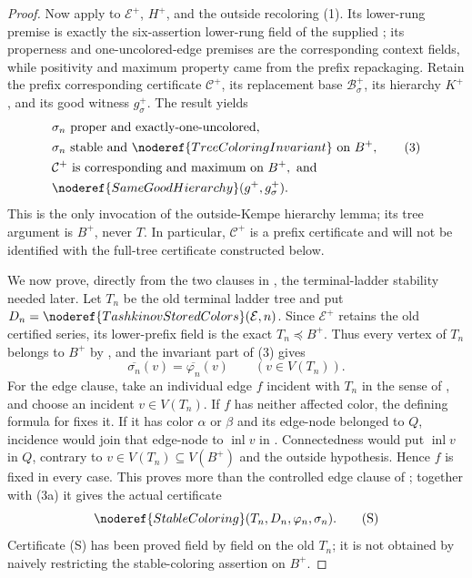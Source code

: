 \begin{proof}
Now apply  to \(\mathcal E^+\), \(H^+\), and
the outside recoloring (1).  Its lower-rung premise is exactly the
six-assertion lower-rung field of the supplied
; its properness and
one-uncolored-edge premises are the corresponding context fields, while
positivity and maximum property came from the prefix repackaging.  Retain
the prefix corresponding certificate \(\mathcal C^+\), its replacement
base \(\mathcal B^+_\sigma\), its hierarchy \(K^+\), and its good witness
\(g^+_\sigma\).  The result yields
\[
 \begin{split}
 &\sigma_n\text{ proper and exactly-one-uncolored},\\
 &\sigma_n\text{ stable and }\noderef{TreeColoringInvariant}\text{ on }B^+,
                                                               \tag{3}\\
 &\mathcal C^+\text{ is corresponding and maximum on }B^+,\text{ and}\\
 &\noderef{SameGoodHierarchy}(g^+,g^+_\sigma).
 \end{split}
\]
This is the only invocation of the outside-Kempe hierarchy lemma; its tree
argument is \(B^+\), never \(T\).  In particular, \(\mathcal C^+\) is a
prefix certificate and will not be identified with the full-tree
certificate constructed below.

We now prove, directly from the two clauses in
, the terminal-ladder stability needed later.
Let \(T_n\) be the old terminal ladder tree and put
\(D_n=\noderef{TashkinovStoredColors}(\mathcal E,n)\).  Since
\(\mathcal E^+\) retains the old certified series, its lower-prefix field
is the exact 
\(T_n\preccurlyeq B^+\).  Thus every vertex of \(T_n\) belongs to
\(B^+\) by , and the invariant part of
(3) gives
\[
 \overline{\sigma_n}(v)=\overline{\varphi_n}(v)
 \qquad(v\in V(T_n)).                                      \tag{3a}
\]
For the edge clause, take an individual edge \(f\) incident with \(T_n\)
in the sense of , and choose an incident
\(v\in V(T_n)\).  If \(f\) has neither affected color, the defining
formula for  fixes it.  If it has color
\(\alpha\) or \(\beta\) and its edge-node belonged to \(Q\), incidence
would join that edge-node to \(\operatorname{inl}v\) in
.  Connectedness would put
\(\operatorname{inl}v\) in
\(Q\), contrary to \(v\in V(T_n)\subseteq V(B^+)\) and the outside
hypothesis.  Hence \(f\) is fixed in every case.  This proves more than
the controlled edge clause of ; together with
(3a) it gives the actual certificate
\[
       \noderef{StableColoring}(T_n,D_n,\varphi_n,\sigma_n). \tag{S}
\]
Certificate (S) has been proved field by field on the old \(T_n\); it is
not obtained by naively restricting the stable-coloring assertion on
\(B^+\).


\end{proof}
